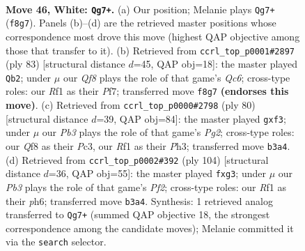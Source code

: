 \documentclass[11pt]{article}
\begin{document}
\clearpage

\begin{figure}[p]\centering
\begin{subfigure}{0.46\textwidth}\centering
\resizebox{\linewidth}{!}{%
\newchessgame
\chessboard[
  setfen={5Q2/3k4/8/1qp5/p7/1P6/P7/5RK1 w - - 1 46},
  showmover=false,
  pgfstyle=straightmove, color=movearrow, markmove={f8-g7}
]}
\caption{}
\end{subfigure}\hfill
\begin{subfigure}{0.46\textwidth}\centering
\resizebox{\linewidth}{!}{%
\newchessgame
\chessboard[
  setfen={8/5pk1/4p2p/8/5QPP/2q5/5P1K/8 b - - 2 42},
  showmover=false,
  pgfstyle=straightmove, color=movearrow, markmove={c3-b2}
]}
\caption{}
\end{subfigure}
\\[4pt]
\begin{subfigure}{0.46\textwidth}\centering
\resizebox{\linewidth}{!}{%
\newchessgame
\chessboard[
  setfen={8/Q7/p7/6p1/8/P1P2pqP/6P1/k6K w - - 0 41},
  showmover=false,
  pgfstyle=straightmove, color=movearrow, markmove={g2-f3}
]}
\caption{}
\end{subfigure}\hfill
\begin{subfigure}{0.46\textwidth}\centering
\resizebox{\linewidth}{!}{%
\newchessgame
\chessboard[
  setfen={8/4Q3/7p/5q1k/4p3/4P1p1/5P2/6K1 w - - 0 53},
  showmover=false,
  pgfstyle=straightmove, color=movearrow, markmove={f2-g3}
]}
\caption{}
\end{subfigure}
\caption{\textbf{Move 46, White: \texttt{Qg7+}.} (a) Our position; Melanie plays \texttt{Qg7+} (\texttt{f8g7}). Panels (b)--(d) are the retrieved master positions whose correspondence most drove this move (highest QAP objective among those that transfer to it). (b) Retrieved from \texttt{ccrl\_top\_p0001\#2897} (ply 83) [structural distance $d$=45, QAP obj=18]: the master played \texttt{Qb2}; under $\mu$ our \emph{Qf8} plays the role of that game's \emph{Qc6}; cross-type roles: our \emph{R}f1 as their \emph{P}f7; transferred move \texttt{f8g7} \textbf{(endorses this move)}. (c) Retrieved from \texttt{ccrl\_top\_p0000\#2798} (ply 80) [structural distance $d$=39, QAP obj=84]: the master played \texttt{gxf3}; under $\mu$ our \emph{Pb3} plays the role of that game's \emph{Pg2}; cross-type roles: our \emph{Q}f8 as their \emph{P}c3, our \emph{R}f1 as their \emph{P}h3; transferred move \texttt{b3a4}. (d) Retrieved from \texttt{ccrl\_top\_p0002\#392} (ply 104) [structural distance $d$=36, QAP obj=55]: the master played \texttt{fxg3}; under $\mu$ our \emph{Pb3} plays the role of that game's \emph{Pf2}; cross-type roles: our \emph{R}f1 as their \emph{p}h6; transferred move \texttt{b3a4}. Synthesis: 1 retrieved analog transferred to \texttt{Qg7+} (summed QAP objective 18, the strongest correspondence among the candidate moves); Melanie committed it via the \texttt{search} selector.}
\label{fig:thought-m90}
\end{figure}
\end{document}

